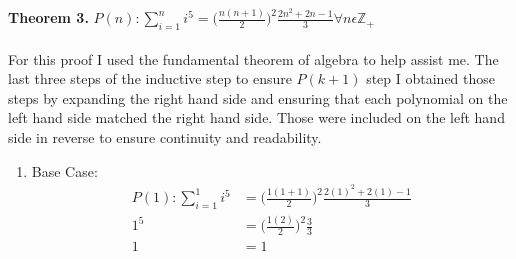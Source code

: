 \documentclass[12pt]{article}
\begin{document}
\noindent \textbf{Theorem 3.}
\begin{math}P(n):\sum\limits_{i = 1}^{n} i^5 = \big(\frac{n(n + 1)}{2}\big)^2\frac{2n^2+2n-1}{3} \forall n \epsilon \mathbb{Z}_+  \end{math}
\\\\For this proof I used the fundamental theorem of algebra to help assist me. The last three steps of the inductive step to ensure \begin{math}P(k+1)\end{math} step I obtained those steps by expanding the right hand side and ensuring that each polynomial on the left hand side matched the right hand side. Those were included on the left hand side in reverse to ensure continuity and readability.\\
\begin{enumerate}
\item Base Case:\\
\begin{align*}
P(1):\sum\limits_{i = 1}^{1} i^5 &= \big(\frac{1(1 + 1)}{2}\big)^2\frac{2(1)^2+2(1)-1}{3}\\
1^5 &= \big(\frac{1(2)}{2}\big)^2\frac{3}{3}\\
1 &= 1
\end{align*}


\end{enumerate}
\end{document}
